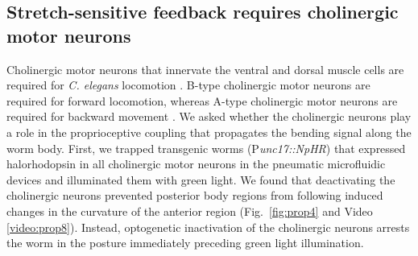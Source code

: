 \subsection{Stretch-sensitive feedback requires cholinergic motor neurons }
 
Cholinergic motor neurons that innervate the ventral and dorsal muscle cells are required for \textit{C. elegans} locomotion \citep{chalfie_neural_1985,leifer_optogenetic_2011}. B-type cholinergic motor neurons are required for forward 
locomotion, whereas A-type cholinergic motor neurons are required for backward movement 
\citep{chalfie_neural_1985}. We asked whether the cholinergic neurons  play a role in the proprioceptive coupling  that propagates the bending signal along the worm body. First, we trapped transgenic worms 
(P\textit{unc17::NpHR}) that expressed halorhodopsin in all cholinergic motor neurons in the pneumatic 
microfluidic devices and illuminated them with green light. We found that deactivating the 
cholinergic neurons prevented posterior body regions from following induced changes in 
the curvature of the anterior region (Fig.~\ref{fig:prop4} and Video  \ref{video:prop8}). Instead, optogenetic 
inactivation of the cholinergic neurons arrests the worm in the posture immediately preceding 
green light illumination.  


